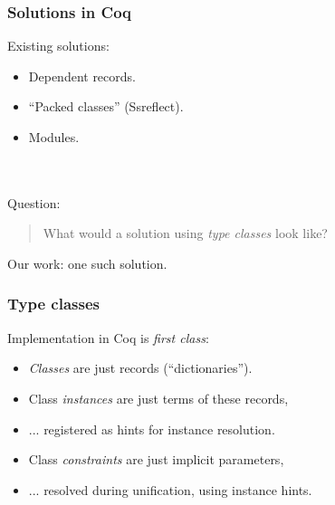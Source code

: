 \documentclass{beamer}
\begin{document}
\begin{frame}
\frametitle{Solutions in Coq}
Existing solutions:
\begin{itemize}
\item Dependent records.
\item ``Packed classes'' (Ssreflect).
\item Modules.
\end{itemize}
\ \\
\ \\

Question:
\begin{quote}
  What would a solution using \emph{type classes} look like?
\end{quote}
Our work: one such solution.


\end{frame}

\begin{frame}
\frametitle{Type classes}

Implementation in Coq is \emph{first class}:
\begin{itemize}
\item \emph{Classes} are just records (``dictionaries'').
\item Class \emph{instances} are just terms of these records,
\item ... registered as hints for instance resolution.
\item Class \emph{constraints} are just implicit parameters,
\item ... resolved during unification, using instance hints.
\end{itemize}

\end{frame}
\end{document}
